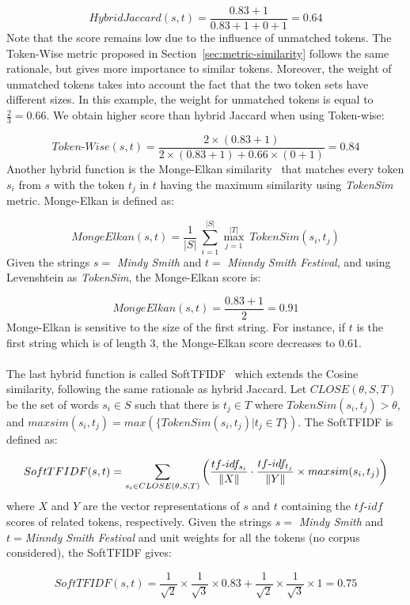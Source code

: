 \begin{equation*}
	HybridJaccard(s,t)=\frac{0.83+1}{0.83+1+0+1}=0.64
\end{equation*}
Note that the score remains low due to the influence of unmatched tokens. The Token-Wise metric proposed in Section~\ref{sec:metric-similarity} follows the same rationale, but gives more importance to similar tokens. Moreover, the weight of unmatched tokens takes into account the fact that the two token sets have different sizes. In this example, the weight for unmatched tokens is equal to $\frac{2}{3}=0.66$. We obtain higher score than hybrid Jaccard when using Token-wise:

\begin{equation*}
	Token\textrm{-}Wise(s,t)=\frac{2 \times (0.83+1)}{2 \times (0.83+1)+ 0.66 \times (0+1)}=0.84
\end{equation*}
Another hybrid function is the Monge-Elkan similarity~\cite{Monge:KDD96} that matches every token $s_i$ from $s$ with the token $t_j$ in $t$ having the maximum similarity using \textit{TokenSim} metric. Monge-Elkan is defined as:

\begin {equation*}
MongeElkan(s,t) = \frac{1}{|S|} {\ } \sum_{i=1}^{|S|}  \max_{j=1}^{|T|} {\ } TokenSim(s_i,t_j)
\end {equation*}
Given the strings $s=$ \textit{Mindy Smith} and $t=$ \textit{Minndy Smith Festival}, and using Levenshtein as \textit{TokenSim}, the Monge-Elkan score is:

\begin{equation*}
	MongeElkan(s,t)=\frac{0.83+1}{2}=0.91
\end{equation*}
Monge-Elkan is sensitive to the size of the first string. For instance, if $t$ is the first string which is of length 3, the Monge-Elkan score decreases to 0.61.
\\
\\
The last hybrid function is called SoftTFIDF~\cite{Cohen:IIWeb03} which extends the Cosine similarity, following the same rationale as hybrid Jaccard. Let $CLOSE(\theta, S, T)$ be the set of words $s_i \in S$ such that there is $t_j \in T$ where $TokenSim(s_i,t_j) > \theta$, and $maxsim(s_i,t_j)=max(\lbrace TokenSim(s_i,t_j) | t_j\in T \rbrace)$. The SoftTFIDF is defined as:

\begin {equation*}
SoftTFIDF(s,t) = \sum_{s_i \in CLOSE(\theta, S, T)} \left( \frac{tf\textrm{-}idf_{s_i}}{\left\lVert X\right\rVert} \cdot \frac{tf\textrm{-}idf_{t_j}}{\left\lVert Y\right\rVert} \times maxsim(s_i,t_j) \right) 
\end {equation*}
where $X$ and $Y$ are the vector representations of $s$ and $t$ containing the $tf\textrm{-}idf$ scores of related tokens, respectively. Given the strings $s=$ \textit{Mindy Smith} and $t=$\textit{Minndy Smith Festival} and unit weights for all the tokens (no corpus considered), the SoftTFIDF gives:

\begin{equation*}
	SoftTFIDF(s,t)=\frac{1}{\sqrt{2}} \times \frac{1}{\sqrt{3}} \times 0.83 + \frac{1}{\sqrt{2}} \times \frac{1}{\sqrt{3}} \times 1 =0.75
\end{equation*}
